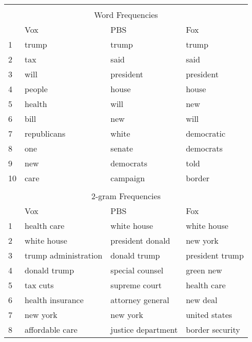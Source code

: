 \begin{table}[H]
    \centering
    \begin{tabular}{|l|l|l|l|} \hline
    \multicolumn{4}{|c|}{}                     \\ 
    \multicolumn{4}{|c|}{Word Frequencies}     \\ \hline \hline
        & Vox         & PBS       & Fox        \\ \hline 
    1   & trump       & trump     & trump      \\
    2   & tax         & said      & said       \\
    3   & will        & president & president  \\
    4   & people      & house     & house      \\
    5   & health      & will      & new        \\
    6   & bill        & new       & will       \\
    7   & republicans & white     & democratic \\
    8   & one         & senate    & democrats  \\
    9   & new         & democrats & told       \\
    10  & care        & campaign  & border     \\ \hline \hline
    \multicolumn{4}{|c|}{}                                            \\
    \multicolumn{4}{|c|}{2-gram Frequencies}                          \\ \hline
        & Vox                  & PBS                & Fox             \\ \hline \hline
    1   & health care          & white house        & white house     \\
    2   & white house          & president donald   & new york        \\
    3   & trump administration & donald trump       & president trump \\
    4   & donald trump         & special counsel    & green new       \\
    5   & tax cuts             & supreme court      & health care     \\
    6   & health insurance     & attorney general   & new deal        \\
    7   & new york             & new york           & united states   \\
    8   & affordable care      & justice department & border security \\

\end{tabular}
\end{table}
